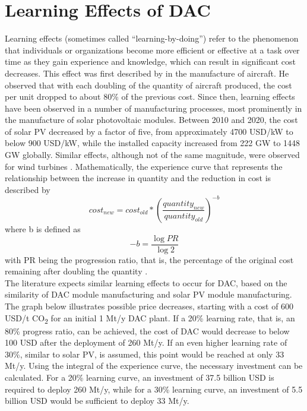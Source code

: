 \chapter{Learning Effects of DAC}
Learning effects (sometimes called “learning-by-doing”) refer to the phenomenon that individuals or organizations become more efficient or effective at a task over time as they gain experience and knowledge, which can result in significant cost decreases.
This effect was first described by \textcite{Wright1936FactorsAirplanes} in the manufacture of aircraft. He observed that with each doubling of the quantity of aircraft produced, the cost per unit dropped to about 80\% of the previous cost. Since then, learning effects have been observed in a number of manufacturing processes, most prominently in the manufacture of solar photovoltaic modules. Between 2010 and 2020, the cost of solar PV decreased by a factor of five, from approximately 4700 USD/kW to below 900 USD/kW, while the installed capacity increased from 222 GW to 1448 GW globally. Similar effects, although not of the same magnitude, were observed for wind turbines \parencite{Shrestha2022LearningDeployment}. Mathematically, the experience curve that represents the relationship between the increase in quantity and the reduction in cost is described by \begin{equation} {cost_{new} = cost_{old}*\left( \frac{quantity_{new}}{quantity_{old}} \right)^{-b}} \end{equation} where b is defined as \begin{equation} -b = \frac{\log{PR}}{\log{2}} \end{equation} with PR being the progression ratio, that is, the percentage of the original cost remaining after doubling the quantity \parencite{Fasihi2019Techno-economicPlants}.\\
The literature expects similar learning effects to occur for DAC, based on the similarity of DAC module manufacturing and solar PV module manufacturing. The graph below illustrates possible price decreases, starting with a cost of 600 USD/t CO\textsubscript{2} for an initial 1 Mt/y DAC plant. If a 20\% learning rate, that is, an 80\% progress ratio, can be achieved, the cost of DAC would decrease to below 100 USD after the deployment of 260 Mt/y. If an even higher learning rate of 30\%, similar to solar PV, is assumed, this point would be reached at only 33 Mt/y. Using the integral of the experience curve, the necessary investment can be calculated. For a 20\% learning curve, an investment of 37.5 billion USD is required to deploy 260 Mt/y, while for a 30\% learning curve, an investment of 5.5 billion USD would be sufficient to deploy 33 Mt/y.

